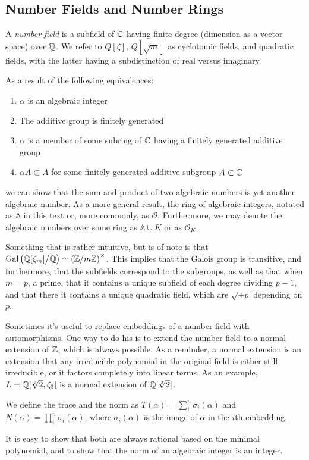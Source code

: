 \documentclass{article}
\begin{document}
\subsection{Number Fields and Number Rings}
\begin{definition}
A \textit{number field} is a subfield of \(\mathbb C\) having finite degree (dimension as a vector space) over \(\mathbb Q\). We refer to \(Q[\zeta]\), \(Q[\sqrt{m}]\) as cyclotomic fields, and quadratic fields, with the latter having a subdistinction of real versus imaginary.
\end{definition}
As a result of the following equivalences:
\begin{enumerate}
    \item \(\alpha\) is an algebraic integer
    \item The additive group is finitely generated
    \item \(\alpha\) is a member of some subring of \(\mathbb C\) having a finitely generated additive group
    \item \(\alpha A \subset A \) for some finitely generated additive subgroup \(A \subset \mathbb C\)
\end{enumerate}
we can show that the sum and product of two algebraic numbers is yet another algebraic number. As a more general result, the ring of algebraic integers, notated as \(\mathbb{A} \) in this text or, more commonly, as \(\mathcal{O}\). Furthermore, we may denote the algebraic numbers over some ring as \(\mathbb{A} \cup K\) or as \(\mathcal{O}_K\).

Something that is rather intuitive, but is of note is that \(\operatorname{Gal}\left(\mathbb Q[\zeta_m] \big/ \mathbb Q \right) \simeq \left(\mathbb Z/m\mathbb Z\right)^{\times}\). This implies that the Galois group is transitive, and furthermore, that the subfields correspond to the subgroups, as well as that when \(m=p\), a prime, that it contains a unique subfield of each degree dividing \(p-1\), and that there it contains a unique quadratic field, which are \(\sqrt{\pm p}\) depending on \(p\).

Sometimes it's useful to replace embeddings of a number field with automorphisms. One way to do his is to extend the number field to a normal extension of \(\mathbb Z\), which is always possible. As a reminder, a normal extension is an extension that any irreducible polynomial in the original field is either still irreducible, or it factors completely into linear terms. As an example, \(L=\mathbb Q[\sqrt[3]{2},\zeta_3]\) is a normal extension of \(\mathbb Q[\sqrt[3]{2}]\).

\begin{definition}
We define the trace and the norm as \( T(\alpha) = \sum_{i}^n \sigma_i(\alpha) \) and \(N(\alpha) = \prod_{i}^n \sigma_i(\alpha)\), where \(\sigma_i(\alpha)\) is the image of \(\alpha\) in the \(i\)th embedding. 
\end{definition}
It is easy to show that both are always rational based on the minimal polynomial, and to show that the norm of an algebraic integer is an integer.
\end{document}
